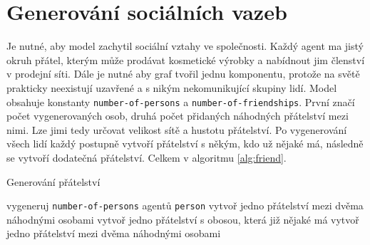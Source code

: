 \documentclass[a4wide,12pt]{report}
\begin{document}
\section{Generování sociálních vazeb}
Je nutné, aby model zachytil sociální vztahy ve společnosti. Každý agent ma jistý okruh přátel, kterým může prodávat kosmetické výrobky a nabídnout jim členství v prodejní síti. Dále je nutné aby graf tvořil jednu komponentu, protože na světě prakticky neexistují uzavřené a s nikým nekomunikující skupiny lidí. Model obsahuje konstanty \texttt{number-of-persons} a \texttt{number-of-friendships}. První značí počet vygenerovaných osob, druhá počet přidaných náhodných přátelství mezi nimi. Lze jimi tedy určovat velikost sítě a hustotu přátelství. Po vygenerování všech lidí každý postupně vytvoří přátelství s někým, kdo už nějaké má, následně se vytvoří dodatečná přátelství. Celkem v algoritmu \ref{alg:friend}.
\begin{algorithm}
\caption{Generování přátelství}
\label{alg:friend}
\begin{algorithmic}
\STATE vygeneruj \texttt{number-of-persons} agentů \texttt{person}
\STATE vytvoř jedno přátelství mezi dvěma náhodnými osobami
  \STATE vytvoř jedno přátelství s obosou, která již nějaké má
\ENDFOR
{}
  \STATE vytvoř jedno přátelství mezi dvěma náhodnými osobami
\ENDFOR
\end{algorithmic}
\end{algorithm}
\end{document}
